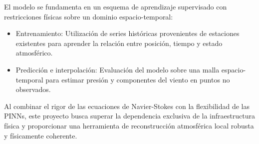 El modelo se fundamenta en un esquema de aprendizaje supervisado con restricciones físicas sobre un dominio espacio-temporal:

\begin{itemize}
    \item Entrenamiento: Utilización de series históricas provenientes de estaciones existentes para aprender la relación entre posición, tiempo y estado atmosférico.

    \item Predicción e interpolación: Evaluación del modelo sobre una malla espacio-temporal para estimar presión y componentes del viento en puntos no observados.
    
\end{itemize}

Al combinar el rigor de las ecuaciones de Navier-Stokes con la flexibilidad de las PINNs, este proyecto busca superar la dependencia exclusiva de la infraestructura física y proporcionar una herramienta de reconstrucción atmosférica local robusta y físicamente coherente.